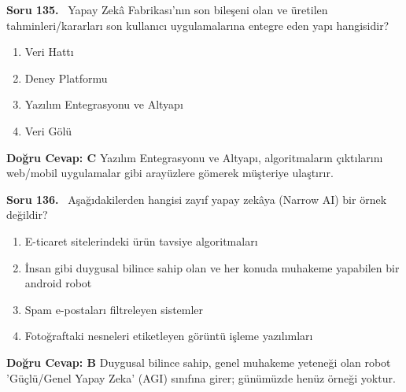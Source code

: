 \documentclass[11pt,a4paper,openany]{book}
\begin{document}
\needspace{5cm}
\vspace{8pt}
\noindent\textbf{\large\sffamily Soru 135.} \ Yapay Zekâ Fabrikası'nın son bileşeni olan ve üretilen tahminleri/kararları son kullanıcı uygulamalarına entegre eden yapı hangisidir?
\begin{enumerate}[label=\Alph*), leftmargin=25pt, topsep=4pt, itemsep=2pt]
    \item Veri Hattı
    \item Deney Platformu
    \item Yazılım Entegrasyonu ve Altyapı
    \item Veri Gölü
\end{enumerate}
\vspace{4pt}
\begin{tcolorbox}[title=Cevap ve Açıklama, colback=gray!3!white, colframe=primarycolor!90!black, arc=2mm, fonttitle=\bfseries\sffamily, top=6pt, bottom=6pt]
    \textbf{Doğru Cevap: C}
    \vspace{2pt}
    Yazılım Entegrasyonu ve Altyapı, algoritmaların çıktılarını web/mobil uygulamalar gibi arayüzlere gömerek müşteriye ulaştırır.
\end{tcolorbox}
\vspace{10pt}

\needspace{5cm}
\vspace{8pt}
\noindent\textbf{\large\sffamily Soru 136.} \ Aşağıdakilerden hangisi zayıf yapay zekâya (Narrow AI) bir örnek değildir?
\begin{enumerate}[label=\Alph*), leftmargin=25pt, topsep=4pt, itemsep=2pt]
    \item E-ticaret sitelerindeki ürün tavsiye algoritmaları
    \item İnsan gibi duygusal bilince sahip olan ve her konuda muhakeme yapabilen bir android robot
    \item Spam e-postaları filtreleyen sistemler
    \item Fotoğraftaki nesneleri etiketleyen görüntü işleme yazılımları
\end{enumerate}
\vspace{4pt}
\begin{tcolorbox}[title=Cevap ve Açıklama, colback=gray!3!white, colframe=primarycolor!90!black, arc=2mm, fonttitle=\bfseries\sffamily, top=6pt, bottom=6pt]
    \textbf{Doğru Cevap: B}
    \vspace{2pt}
    Duygusal bilince sahip, genel muhakeme yeteneği olan robot 'Güçlü/Genel Yapay Zeka' (AGI) sınıfına girer; günümüzde henüz örneği yoktur.
\end{tcolorbox}
\vspace{10pt}
\end{document}

